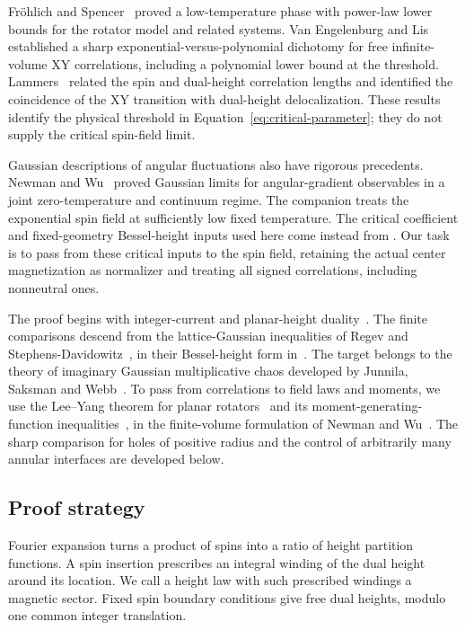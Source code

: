 Fr\"ohlich and Spencer~\cite{FS} proved a low-temperature phase with
power-law lower bounds for the rotator model and related systems.
Van Engelenburg and Lis~\cite[Theorem 1]{vEL} established a sharp
exponential-versus-polynomial dichotomy for free infinite-volume XY
correlations, including a polynomial lower bound at the threshold.
Lammers~\cite[Theorem 1]{Lammers2023} related the spin and dual-height
correlation lengths and identified the coincidence of the XY
transition with dual-height delocalization. These results identify
the physical threshold in Equation~\eqref{eq:critical-parameter};
they do not supply the critical spin-field limit.

Gaussian descriptions of angular fluctuations also have rigorous
precedents. Newman and Wu~\cite[Theorem 2]{NewmanWu2018} proved
Gaussian limits for angular-gradient observables in a joint
zero-temperature and continuum regime. The companion
\cite[Theorem 7.6]{B} treats the exponential spin field at sufficiently
low fixed temperature. The critical coefficient and fixed-geometry
Bessel-height inputs used here come instead from
\cite[Section 6 and Theorems 2.4, 3.1, 3.2]{C}.
Our task is to pass from these critical inputs to the spin field,
retaining the actual center magnetization as normalizer and treating
all signed correlations, including nonneutral ones.

The proof begins with integer-current and planar-height
duality~\cite[Section 2]{vEL}. The finite comparisons descend from
the lattice-Gaussian inequalities of Regev and
Stephens-Davidowitz~\cite{RSD}, in their Bessel-height form
in~\cite{C}. The target belongs to the theory of imaginary Gaussian
multiplicative chaos developed by Junnila, Saksman and
Webb~\cite{JSW2020}. To pass from correlations to field laws and
moments, we use the Lee--Yang theorem for planar
rotators~\cite{DunlopNewman1975} and its moment-generating-function
inequalities~\cite{Newman1975}, in the finite-volume formulation
of Newman and Wu~\cite{NewmanWu2019}. The sharp comparison for holes
of positive radius and the control of arbitrarily many annular
interfaces are developed below.

\subsection{Proof strategy}

Fourier expansion turns a product of spins into a ratio of height
partition functions. A spin insertion prescribes an integral winding
of the dual height around its location. We call a height law with
such prescribed windings a magnetic sector. Fixed spin boundary
conditions give free dual heights, modulo one common integer
translation.

